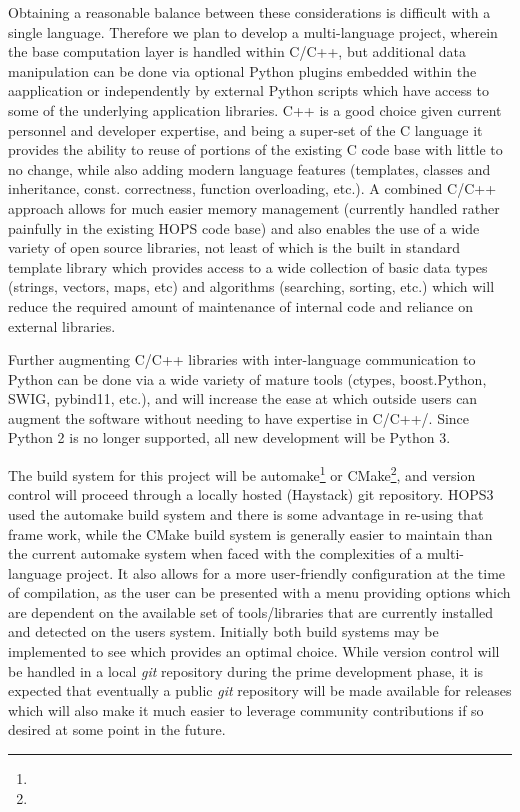 \documentclass[hidelinks]{article}
\makeatletter
\newcommand\urlfootnote@[1]{\footnote{\url@{#1}}}
\DeclareRobustCommand{\urlfootnote}{\hyper@normalise\urlfootnote@}
\makeatother
\begin{document}
Obtaining a reasonable balance between these considerations is difficult with a single language. Therefore we
plan to develop a multi-language project, wherein the base computation layer is handled within C/C++,
but additional data manipulation can be done via optional Python plugins embedded within the aapplication
or independently by external Python scripts which have access to some of the underlying application libraries.
C++ is a good choice given current personnel and developer expertise, and being a super-set of the C language
it provides the ability to reuse of portions of the existing C code base with little to no change, while also adding modern language features
(templates, classes and inheritance, const. correctness, function overloading, etc.). A combined C/C++ approach
allows for much easier memory management (currently handled rather painfully in the existing HOPS code base) and also
enables the use of a wide variety of open source libraries, not least of which is the built in standard template library
which provides access to a wide collection of basic data types (strings, vectors, maps, etc) and algorithms (searching, sorting, etc.)
which will reduce the required amount of maintenance of internal code and reliance on external libraries.

Further augmenting C/C++ libraries with inter-language communication to Python can be done via a wide variety of mature tools
(ctypes, boost.Python, SWIG, pybind11, etc.), and will increase the ease at which outside users can augment the software without
needing to have expertise in C/C++/. Since Python 2 is no longer supported, all new development will be Python 3.

The build system for this project will be automake\urlfootnote{https://www.gnu.org/software/automake/} or CMake\urlfootnote{https://cmake.org}, and version control will proceed through a locally hosted (Haystack) git repository. HOPS3 used the automake build system and there is some
advantage in re-using that frame work, while the CMake build system is generally easier to maintain than the current automake system when faced with the complexities of a multi-language project. It also allows for a more user-friendly configuration at the time of compilation, as the user can be presented with a menu providing options which are dependent on the available set of tools/libraries that are currently installed and detected on the users system. Initially
both build systems may be implemented to see which provides an optimal choice. While version control will be handled in a local \textit{git} repository during
the prime development phase, it is expected that eventually a public \textit{git} repository will be made available for releases which will also make it much easier to leverage community contributions if so desired at some point in the future.
\end{document}
